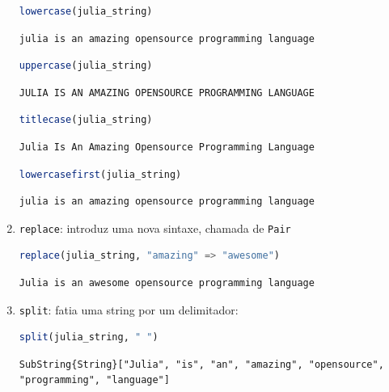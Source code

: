 \documentclass[
  notoc %
]{tufte-book}
\newcommand{\passthrough}[1]{#1}
\begin{document}
\begin{enumerate}
  \begin{lstlisting}[language=Julia]
  lowercase(julia_string)
  \end{lstlisting}

  \begin{lstlisting}[language=Output]
  julia is an amazing opensource programming language
  \end{lstlisting}

  \begin{lstlisting}[language=Julia]
  uppercase(julia_string)
  \end{lstlisting}

  \begin{lstlisting}[language=Output]
  JULIA IS AN AMAZING OPENSOURCE PROGRAMMING LANGUAGE
  \end{lstlisting}

  \begin{lstlisting}[language=Julia]
  titlecase(julia_string)
  \end{lstlisting}

  \begin{lstlisting}[language=Output]
  Julia Is An Amazing Opensource Programming Language
  \end{lstlisting}

  \begin{lstlisting}[language=Julia]
  lowercasefirst(julia_string)
  \end{lstlisting}

  \begin{lstlisting}[language=Output]
  julia is an amazing opensource programming language
  \end{lstlisting}
\item
  \passthrough{\lstinline!replace!}: introduz uma nova sintaxe, chamada
  de \passthrough{\lstinline!Pair!}

  \begin{lstlisting}[language=Julia]
  replace(julia_string, "amazing" => "awesome")
  \end{lstlisting}

  \begin{lstlisting}[language=Output]
  Julia is an awesome opensource programming language
  \end{lstlisting}
\item
  \passthrough{\lstinline!split!}: fatia uma string por um delimitador:

  \begin{lstlisting}[language=Julia]
  split(julia_string, " ")
  \end{lstlisting}

  \begin{lstlisting}[language=Output]
  SubString{String}["Julia", "is", "an", "amazing", "opensource", "programming", "language"]
  \end{lstlisting}
\end{enumerate}
\end{document}
